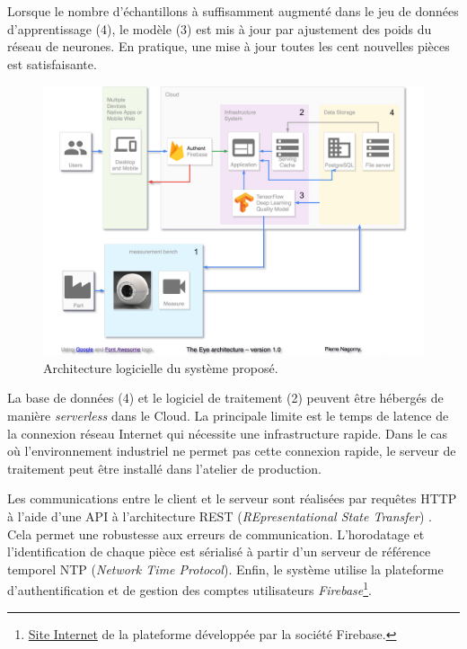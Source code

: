 Lorsque le nombre d'échantillons à suffisamment augmenté dans le jeu de données d'apprentissage (4), le modèle (3) est mis à jour par ajustement des poids du réseau de neurones.
En pratique, une mise à jour toutes les cent nouvelles pièces est satisfaisante.

\begin{figure}[tbh]
	\centering
	\includegraphics[width=\textwidth,height=\textheight,keepaspectratio]{../Chap5/Figures/TE_architecture.pdf}
	\caption{Architecture logicielle du système proposé.}
	\label{fig:architecture}
\end{figure}

La base de données (4) et le logiciel de traitement (2) peuvent être hébergés de manière \textit{serverless} dans le Cloud.
La principale limite est le temps de latence de la connexion réseau Internet qui nécessite une infrastructure rapide.
Dans le cas où l'environnement industriel ne permet pas cette connexion rapide, le serveur de traitement peut être installé dans l'atelier de production.

Les communications entre le client et le serveur sont réalisées par requêtes HTTP à l'aide d'une API à l'architecture REST (\textit{REpresentational State Transfer}) \cite{fielding_architectural_2000}.
Cela permet une robustesse aux erreurs de communication.
L'horodatage et l'identification de chaque pièce est sérialisé à partir d'un serveur de référence temporel NTP (\textit{Network Time Protocol}).
Enfin, le système utilise la plateforme d'authentification et de gestion des comptes utilisateurs \textit{Firebase}\footnote{\href{https://firebase.google.com/}{Site Internet} de la plateforme développée par la société Firebase.}.


